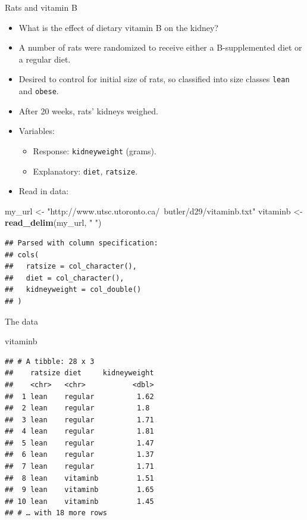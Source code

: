 \documentclass[ignorenonframetext,]{beamer}
\newenvironment{Shaded}{\begin{snugshade}}{\end{snugshade}}
\newcommand{\KeywordTok}[1]{\textcolor[rgb]{0.13,0.29,0.53}{\textbf{#1}}}
\newcommand{\NormalTok}[1]{#1}
\newcommand{\StringTok}[1]{\textcolor[rgb]{0.31,0.60,0.02}{#1}}
\begin{document}
\begin{frame}[fragile]{Rats and vitamin B}
\protect\hypertarget{rats-and-vitamin-b}{}

\begin{itemize}
\item
  What is the effect of dietary vitamin B on the kidney?
\item
  A number of rats were randomized to receive either a B-supplemented
  diet or a regular diet.
\item
  Desired to control for initial size of rats, so classified into size
  classes \texttt{lean} and \texttt{obese}.
\item
  After 20 weeks, rats' kidneys weighed.
\item
  Variables:

  \begin{itemize}
  \item
    Response: \texttt{kidneyweight} (grams).
  \item
    Explanatory: \texttt{diet}, \texttt{ratsize}.
  \end{itemize}
\item
  Read in data:
\end{itemize}

\begin{Shaded}
\begin{Highlighting}[]
\NormalTok{my_url <-}\StringTok{ "http://www.utsc.utoronto.ca/~butler/d29/vitaminb.txt"}
\NormalTok{vitaminb <-}\StringTok{ }\KeywordTok{read_delim}\NormalTok{(my_url, }\StringTok{" "}\NormalTok{)}
\end{Highlighting}
\end{Shaded}

\begin{verbatim}
## Parsed with column specification:
## cols(
##   ratsize = col_character(),
##   diet = col_character(),
##   kidneyweight = col_double()
## )
\end{verbatim}

\end{frame}

\begin{frame}[fragile]{The data}
\protect\hypertarget{the-data-7}{}

\begin{Shaded}
\begin{Highlighting}[]
\NormalTok{vitaminb}
\end{Highlighting}
\end{Shaded}

\begin{verbatim}
## # A tibble: 28 x 3
##    ratsize diet     kidneyweight
##    <chr>   <chr>           <dbl>
##  1 lean    regular          1.62
##  2 lean    regular          1.8 
##  3 lean    regular          1.71
##  4 lean    regular          1.81
##  5 lean    regular          1.47
##  6 lean    regular          1.37
##  7 lean    regular          1.71
##  8 lean    vitaminb         1.51
##  9 lean    vitaminb         1.65
## 10 lean    vitaminb         1.45
## # … with 18 more rows
\end{verbatim}

\end{frame}
\end{document}
